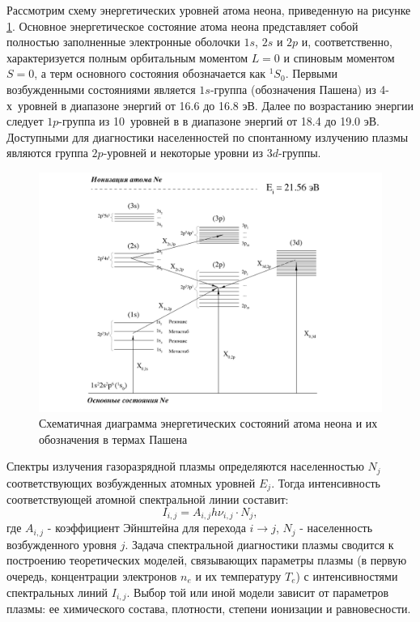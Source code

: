Рассмотрим схему энергетических уровней атома неона, приведенную на
рисунке \ref{fig:energy_diag_NE}. Основное энергетическое состояние атома неона представляет собой
полностью заполненные электронные оболочки $1s$, $2s$ и $2p$ и, соответственно,
характеризуется полным орбитальным моментом $L = 0$ и спиновым моментом $S = 0$, а
терм основного состояния обозначается как $^1S_0$. Первыми возбужденными
состояниями является $1s$-группа (обозначения Пашена) из 4-х~уровней в диапазоне
энергий от 16.6 до 16.8 эВ.
Далее по возрастанию энергии следует $1p$-группа из 10~уровней в в диапазоне
энергий от 18.4 до 19.0 эВ. Доступными для диагностики населенностей по спонтанному
излучению плазмы являются группа $2p$-уровней и некоторые уровни из $3d$-группы.

\begin{figure}[t]
  \centering
  \includegraphics[width=16cm]{figures/energy_diag_NE}
  \caption{Схематичная диаграмма энергетических состояний атома неона и их обозначения в термах Пашена}
  \label{fig:energy_diag_NE}
\end{figure}

Спектры излучения газоразрядной плазмы определяются населенностью $N_j$ соответствующих возбужденных атомных уровней $E_j$.
Тогда интенсивность соответствующей атомной спектральной линии составит:
\begin{equation}
    I_{i,j} = A_{i,j}h\nu_{i,j}⋅N_j,
\end{equation}
где $A_{i,j}$  - коэффициент Эйнштейна для перехода $i → j$, $N_j$ - населенность возбужденного уровня $j$.
Задача спектральной диагностики плазмы сводится к построению теоретических моделей, связывающих
параметры плазмы (в первую очередь, концентрации электронов $n_e$ и их температуру $T_e$) с интенсивностями спектральных
линий $I_{i,j}$. Выбор той или иной модели зависит от параметров плазмы: ее химического состава, плотности,
степени ионизации и равновесности.

